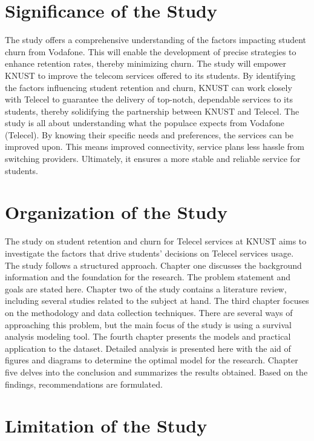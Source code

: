 \documentclass[doublespacing,12pt]{report}
\begin{document}
\section{Significance of the Study}

The study offers a comprehensive understanding of the factors impacting student churn from Vodafone. This will enable the development of precise strategies to enhance retention rates, thereby minimizing churn. The study will empower KNUST to improve the telecom services offered to its students. By identifying the factors influencing student retention and churn, KNUST can work closely with Telecel to guarantee the delivery of top-notch, dependable services to its students, thereby solidifying the partnership between KNUST and Telecel. The study is all about understanding what the populace expects from Vodafone (Telecel). By knowing their specific needs and preferences, the services can be improved upon. This means improved connectivity, service plans less hassle from switching providers. Ultimately, it ensures a more stable and reliable service for students.

\section{Organization of the Study}

The study on student retention and churn for Telecel services at KNUST aims to investigate the factors that drive students' decisions on Telecel services usage. The study follows a structured approach. Chapter one discusses the background information and the foundation for the research. The problem statement and goals are stated here. Chapter two of the study contains a literature review, including several studies related to the subject at hand. The third chapter focuses on the methodology and data collection techniques. There are several ways of approaching this problem, but the main focus of the study is using a survival analysis modeling tool. The fourth chapter presents the models and practical application to the dataset. Detailed analysis is presented here with the aid of figures and diagrams to determine the optimal model for the research. Chapter five delves into the conclusion and summarizes the results obtained. Based on the findings, recommendations are formulated.

\section{Limitation of the Study}
\end{document}
